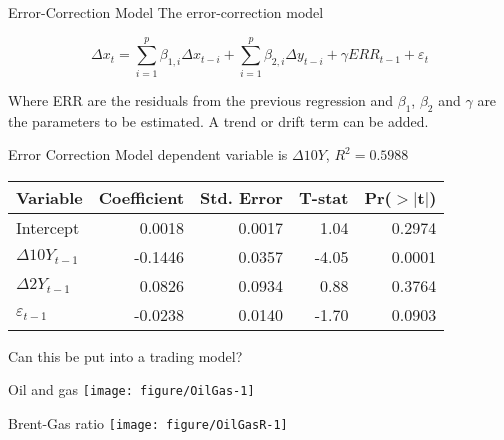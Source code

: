 \documentclass[14pt,xcolor=pdftex,dvipsnames,table]{beamer}\usepackage[]{graphicx}\usepackage[]{color}
\makeatletter
\def\maxwidth{ %
  \ifdim\Gin@nat@width>\linewidth
    \linewidth
  \else
    \Gin@nat@width
  \fi
}
\newenvironment{knitrout}{}{} %
\makeatother
\begin{document}
\begin{frame}{Error-Correction Model}
The error-correction model
\begin{block}{}
\begin{equation*}
\Delta x_t = \sum_{i = 1}^p \beta_{1,i} \Delta x_{t-i} + \sum_{i = 1}^p \beta_{2, i} \Delta y_{t-i} + \gamma ERR_{t-1} +\varepsilon_t
\end{equation*}
\end{block}
Where ERR are the residuals from the previous regression and $\beta_1$, $\beta_2$ and $\gamma$ are the parameters to be estimated.  A trend or drift term can be added.
\end{frame}

\begin{frame}{Error Correction Model}
dependent variable is $\Delta 10Y$, $R^2  = 0.5988$
\begin{table}[ht]
\centering
\begin{tabular}{lrrrr}
  \hline
Variable & Coefficient  & Std. Error & T-stat& Pr($>$$|$t$|$)  \\ 
  \hline
Intercept & 0.0018 & 0.0017 & 1.04 & 0.2974 \\ 
$\Delta 10Y_{t-1}$ & -0.1446 & 0.0357 & -4.05 & 0.0001 \\ 
$\Delta 2Y_{t-1}$ & 0.0826 & 0.0934 & 0.88 & 0.3764 \\ 
$\varepsilon_{t-1}$ & -0.0238 & 0.0140 & -1.70 & 0.0903 \\ 
   \hline
\end{tabular}
\end{table}
Can this be put into a trading model?
\end{frame}

\begin{frame}{Oil and gas}
\begin{knitrout}
\color{fgcolor}
\texttt{[image: figure/OilGas-1]} 

\end{knitrout}
\end{frame}

\begin{frame}{Brent-Gas ratio}
\begin{knitrout}
\color{fgcolor}
\texttt{[image: figure/OilGasR-1]} 

\end{knitrout}
\end{frame}
\end{document}
